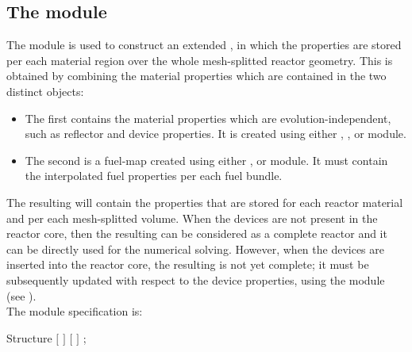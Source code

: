 \subsection{The  module}\label{sect:macini}

\vskip 0.2cm
The  module is used to construct an extended ,
in which the properties are stored per each material region over the whole
mesh-splitted reactor geometry. This  is obtained by combining
the material properties which are contained in the two distinct 
objects:

\begin{itemize}
\item The first  contains the material properties which are
evolution-independent, such as reflector and device properties. It is created
using either , ,  or  module.
\item The second is a fuel-map  created using either ,
 or  module. It must contain the interpolated fuel properties per
each fuel bundle.
\end{itemize}

The resulting  will contain the properties that are stored for each
reactor material and per each mesh-splitted volume. When the devices are not
present in the reactor core, then the resulting  can be considered
as a complete reactor  and it can be directly used for the numerical
solving. However, when the devices are inserted into the reactor core, the resulting
 is not yet complete; it must be subsequently updated with respect
to the device properties, using the  module (see ).\\

\noindent
The  module specification is:

\begin{DataStructure}{Structure }
  \moc{:=} 
  $[$   $]$ \moc{::}
$[$   $]$ ;
\end{DataStructure}

